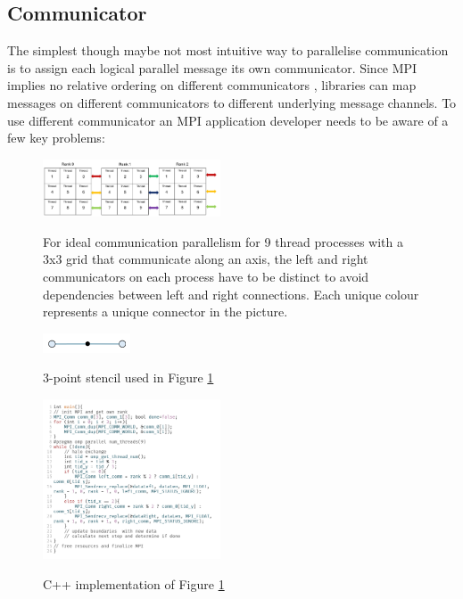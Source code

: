 \documentclass[sigconf]{acmart}
\begin{document}
\subsection{Communicator}

The simplest though maybe not most intuitive way to parallelise communication is to assign each logical parallel message its own communicator.
Since MPI implies no relative ordering on different communicators \cite{zambreLessonsLearned2022}, libraries can map messages on different communicators to different underlying message channels.
To use different communicator an MPI application developer needs to be aware of a few key problems:

\begin{figure}
    \caption{
        For ideal communication parallelism for 9 thread processes with a 3x3 grid that communicate along an axis, the left and right communicators on each process have to be distinct to avoid dependencies between left and right connections.
        Each unique colour represents a unique connector in the picture.
    }
    \includegraphics[width=0.47\textwidth]{Communicator_Line.png}
    \label{fig:Communicator_Line}
\end{figure}

\begin{figure}
    \caption{3-point stencil used in Figure \ref{fig:Communicator_Line}}
    \includegraphics[width=0.23\textwidth]{3_point_stencil.png}
    \label{fig:3pointStencil}
\end{figure}

\begin{figure}
    \caption{C++ implementation of Figure \ref{fig:Communicator_Line}}
    \includegraphics[width=0.47\textwidth]{Communicator_Line_CPP.png}
    \label{fig:Communicator_Line_CPP}
\end{figure}
\end{document}
